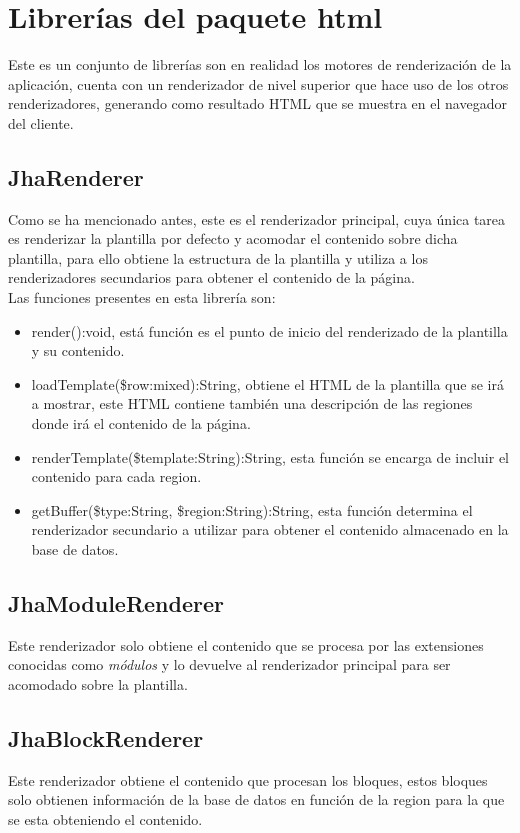 \section{Librer\'ias del paquete \textsf{html}}
Este es un conjunto de librer\'ias son en realidad los motores de renderizaci\'on de la aplicaci\'on, cuenta con un renderizador de nivel superior que hace uso de los otros renderizadores, generando como resultado HTML que se muestra en el navegador del cliente.

\subsection{JhaRenderer}
Como se ha mencionado antes, este es el renderizador principal, cuya \'unica tarea es renderizar la plantilla por defecto y acomodar el contenido sobre dicha plantilla, para ello obtiene la estructura de la plantilla y utiliza a los renderizadores secundarios para obtener el contenido de la p\'agina.\\
Las funciones presentes en esta librer\'ia son:

\begin{itemize}
\item \textsf{render():void}, est\'a funci\'on es el punto de inicio del renderizado de la plantilla y su contenido.
\item \textsf{loadTemplate(\$row:mixed):String}, obtiene el HTML de la plantilla que se ir\'a a mostrar, este HTML contiene tambi\'en una descripci\'on de las regiones donde ir\'a el contenido de la p\'agina.
\item \textsf{renderTemplate(\$template:String):String}, esta funci\'on se encarga de incluir el contenido para cada region.
\item \textsf{getBuffer(\$type:String, \$region:String):String}, esta funci\'on determina el renderizador secundario a utilizar para obtener el contenido almacenado en la base de datos.
\end{itemize}

\subsection{JhaModuleRenderer}
Este renderizador solo obtiene el contenido que se procesa por las extensiones conocidas como \textit{m\'odulos} y lo devuelve al renderizador principal para ser acomodado sobre la plantilla.

\subsection{JhaBlockRenderer}
Este renderizador obtiene el contenido que procesan los bloques, estos bloques solo obtienen informaci\'on de la base de datos en funci\'on de la region para la que se esta obteniendo el contenido.

